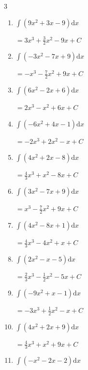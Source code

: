 \begin{multicols}{3}
\begin{enumerate}
  \item $\displaystyle \int \left( 9x^{2}+3x-9 \right) \mathrm{d}x$

        $\displaystyle =3x^{3}+\frac{3}{2}x^{2}-9x+ C$

  \item $\displaystyle \int \left( -3x^{2}-7x+9 \right) \mathrm{d}x$

        $\displaystyle =-x^{3}-\frac{7}{2}x^{2}+9x+ C$

  \item $\displaystyle \int \left( 6x^{2}-2x+6 \right) \mathrm{d}x$

        $\displaystyle =2x^{3}-x^{2}+6x+ C$

  \item $\displaystyle \int \left( -6x^{2}+4x-1 \right) \mathrm{d}x$

        $\displaystyle =-2x^{3}+2x^{2}-x+ C$

  \item $\displaystyle \int \left( 4x^{2}+2x-8 \right) \mathrm{d}x$

        $\displaystyle =\frac{4}{3}x^{3}+x^{2}-8x+ C$

  \item $\displaystyle \int \left( 3x^{2}-7x+9 \right) \mathrm{d}x$

        $\displaystyle =x^{3}-\frac{7}{2}x^{2}+9x+ C$

  \item $\displaystyle \int \left( 4x^{2}-8x+1 \right) \mathrm{d}x$

        $\displaystyle =\frac{4}{3}x^{3}-4x^{2}+x+ C$

  \item $\displaystyle \int \left( 2x^{2}-x-5 \right) \mathrm{d}x$

        $\displaystyle =\frac{2}{3}x^{3}-\frac{1}{2}x^{2}-5x+ C$

\columnbreak %

\resetques

  \item $\displaystyle \int \left( -9x^{2}+x-1 \right) \mathrm{d}x$

        $\displaystyle =-3x^{3}+\frac{1}{2}x^{2}-x+ C$

  \item $\displaystyle \int \left( 4x^{2}+2x+9 \right) \mathrm{d}x$

        $\displaystyle =\frac{4}{3}x^{3}+x^{2}+9x+ C$

  \item $\displaystyle \int \left( -x^{2}-2x-2 \right) \mathrm{d}x$


\end{enumerate}
\end{multicols}

